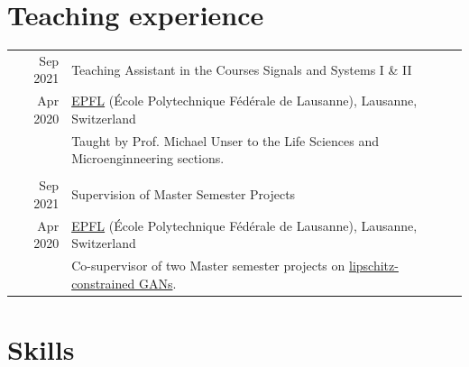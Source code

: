 \documentclass[a4paper,11pt]{article}
\def\datespace{-2pt}
\def\title-main-sep{4pt}
\begin{document}
  \vspace{15pt}

  \section{Teaching experience}

    \begin{tabular}{r|p{13cm}}

	  {\small Sep 2021} & Teaching Assistant in the Courses Signals and Systems I \& II \\[\datespace]
	  {\small Apr 2020} & \small{\href{https://www.epfl.ch/en/}{EPFL} (École Polytechnique Fédérale de Lausanne), Lausanne, Switzerland} \\[\title-main-sep]
    & {\footnotesize Taught by Prof. Michael Unser to the Life Sciences and Microenginneering sections.} \\

    \multicolumn{2}{c}{} \\

    {\small Sep 2021} & Supervision of Master Semester Projects \\[\datespace]
    {\small Apr 2020} & \small{\href{https://www.epfl.ch/en/}{EPFL} (École Polytechnique Fédérale de Lausanne), Lausanne, Switzerland} \\[\title-main-sep]
    & \footnotesize{Co-supervisor of two Master semester projects on \href{https://bigwww.epfl.ch/teaching/projects/abstract.html?f=00388}{lipschitz-constrained GANs}.} \\

    \end{tabular}


    \vspace{15pt}

    \section{Skills}
\end{document}
